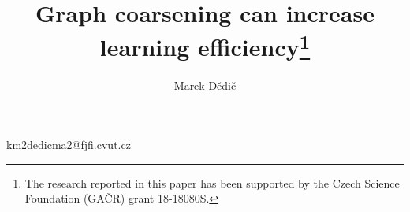 

\title{Graph coarsening can increase learning efficiency\thanks{The research reported in this paper has been supported by the Czech Science Foundation (GAČR) grant 18-18080S.}}
\author{Marek Dědič}{km}{2}{dedicma2@fjfi.cvut.cz}



\maketitle













